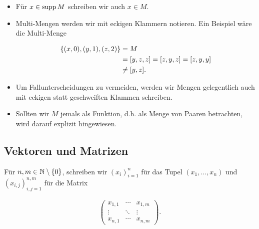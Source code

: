             \begin{itemize}

                \item Für $x \in \operatorname{supp} M$ schreiben wir auch $x \in M$.

                \item Multi-Mengen werden wir mit eckigen Klammern notieren.
                Ein Beispiel wäre die Multi-Menge
                
                \begin{align*}
                    {\left \{ (x, 0), (y, 1), (z, 2) \right \}}
                    & =
                    M \\
                    & =
                    [y, z, z] = [z, y, z] = [z, y, y] \\
                    & \neq
                    [y, z].
                \end{align*}

                \item Um Fallunterscheidungen zu vermeiden, werden wir Mengen gelegentlich auch mit eckigen statt geschweiften Klammen schreiben.
                
                \item Sollten wir $M$ jemals als Funktion, d.h. als Menge von Paaren betrachten, wird darauf explizit hingewiesen.

            \end{itemize}


        \subsection{Vektoren und Matrizen}

            Für $n, m \in \mathbb N \setminus {\left \{ 0 \right \}}$, schreiben wir $(x_i)_{i=1}^n$ für das Tupel $(x_1, \dots, x_n)$ und $(x_{i, j})_{i, j = 1}^{n, m}$ für die Matrix

            \begin{align*}
                \begin{pmatrix}
                    x_{1, 1} & \cdots & x_{1, m} \\
                    \vdots   & \ddots & \vdots   \\
                    x_{n, 1} & \cdots & x_{n, m}
                \end{pmatrix}.
            \end{align*}

